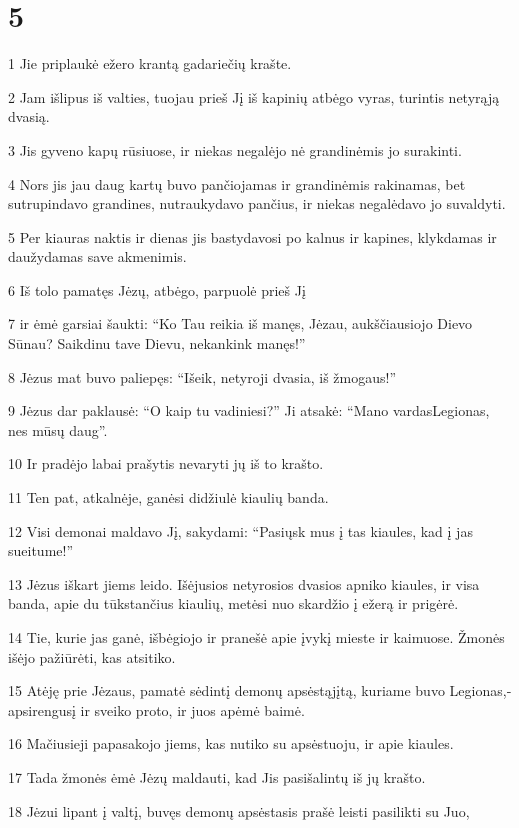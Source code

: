 \chapter{5}


\par 1 Jie priplaukė ežero krantą gadariečių krašte. 
\par 2 Jam išlipus iš valties, tuojau prieš Jį iš kapinių atbėgo vyras, turintis netyrąją dvasią. 
\par 3 Jis gyveno kapų rūsiuose, ir niekas negalėjo nė grandinėmis jo surakinti. 
\par 4 Nors jis jau daug kartų buvo pančiojamas ir grandinėmis rakinamas, bet sutrupindavo grandines, nutraukydavo pančius, ir niekas negalėdavo jo suvaldyti. 
\par 5 Per kiauras naktis ir dienas jis bastydavosi po kalnus ir kapines, klykdamas ir daužydamas save akmenimis. 
\par 6 Iš tolo pamatęs Jėzų, atbėgo, parpuolė prieš Jį 
\par 7 ir ėmė garsiai šaukti: “Ko Tau reikia iš manęs, Jėzau, aukščiausiojo Dievo Sūnau? Saikdinu tave Dievu, nekankink manęs!” 
\par 8 Jėzus mat buvo paliepęs: “Išeik, netyroji dvasia, iš žmogaus!” 
\par 9 Jėzus dar paklausė: “O kaip tu vadiniesi?” Ji atsakė: “Mano vardas­Legionas, nes mūsų daug”. 
\par 10 Ir pradėjo labai prašytis nevaryti jų iš to krašto. 
\par 11 Ten pat, atkalnėje, ganėsi didžiulė kiaulių banda. 
\par 12 Visi demonai maldavo Jį, sakydami: “Pasiųsk mus į tas kiaules, kad į jas sueitume!” 
\par 13 Jėzus iškart jiems leido. Išėjusios netyrosios dvasios apniko kiaules, ir visa banda, apie du tūkstančius kiaulių, metėsi nuo skardžio į ežerą ir prigėrė. 
\par 14 Tie, kurie jas ganė, išbėgiojo ir pranešė apie įvykį mieste ir kaimuose. Žmonės išėjo pažiūrėti, kas atsitiko. 
\par 15 Atėję prie Jėzaus, pamatė sėdintį demonų apsėstąjį­tą, kuriame buvo Legionas,­apsirengusį ir sveiko proto, ir juos apėmė baimė. 
\par 16 Mačiusieji papasakojo jiems, kas nutiko su apsėstuoju, ir apie kiaules. 
\par 17 Tada žmonės ėmė Jėzų maldauti, kad Jis pasišalintų iš jų krašto. 
\par 18 Jėzui lipant į valtį, buvęs demonų apsėstasis prašė leisti pasilikti su Juo, 
